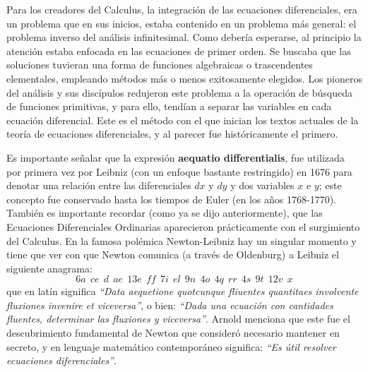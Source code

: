 \documentclass[12pt,a4paper,oneside]{book}
\begin{document}
	\medskip
	\noindent
	Para los creadores del Calculus, la integración de las ecuaciones diferenciales, era un problema que en sus inicios, estaba contenido en un problema más general: el problema inverso del análisis infinitesimal. Como debería esperarse, al principio la atención estaba enfocada en las ecuaciones de primer orden. Se buscaba que las soluciones tuvieran una forma de funciones algebraicas o trascendentes elementales, empleando métodos más o menos exitosamente elegidos. Los pioneros del análisis y sus discípulos redujeron este problema a la operación de búsqueda de funciones primitivas, y para ello, tendían a separar las variables en cada ecuación diferencial. Este es el método con el que inician los textos actuales de la teoría de ecuaciones diferenciales, y al parecer fue históricamente el primero.
	
	\medskip
	\noindent
	Es importante señalar que la expresión \textbf{aequatio differentialis}, fue utilizada por primera vez por Leibniz (con un enfoque bastante restringido) en 1676 para denotar una relación entre las diferenciales $dx$ y $dy$ y dos variables $x$ e $y$; este concepto fue conservado hasta los tiempos de Euler (en los años 1768-1770). También es importante recordar (como ya se dijo anteriormente), que las Ecuaciones Diferenciales Ordinarias aparecieron prácticamente con el surgimiento del Calculus. En la famosa polémica Newton-Leibniz hay un singular momento y tiene que ver con que Newton comunica (a través de Oldenburg) a Leibniz el siguiente anagrama:
	\[
	6a \ \ ce \ \ d \ \ ae\ \ 13e \ \ ff \ \ 7i \ \ el \ \ 9n \ \ 4o \ \ 4q \ \ rr \ \ 4s \ \ 9t \ \ 12v \ \ x
	\]
	que en latín significa \textit{\textquotedblleft Data aequetione quotcunque fliuentes quantitaes involvente fluxiones invenire et viceversa\textquotedblright}, o bien: \textit{\textquotedblleft Dada una ecuación con cantidades fluentes, determinar las fluxiones y viceversa\textquotedblright}. Arnold menciona que este fue el descubrimiento fundamental de Newton que consideró necesario mantener en secreto, y en lenguaje matemático contemporáneo significa: \textit{\textquotedblleft Es útil resolver ecuaciones diferenciales\textquotedblright}.
	
\end{document}
